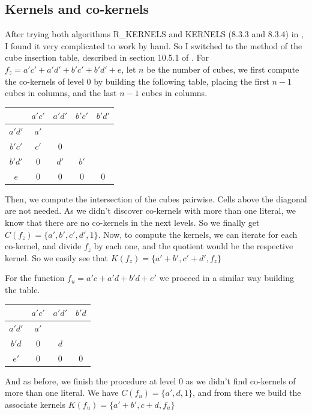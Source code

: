 \documentclass[a4paper]{article}
\begin{document}
\subsection{Kernels and co-kernels}
%
After trying both algorithms R\_KERNELS and KERNELS (8.3.3 and 8.3.4) in 
\cite{micheli}, I found it very complicated to work by hand. So I switched to 
the method of the cube insertion table, described in section 10.5.1 of 
\cite{hachtel}.
%
For $f_z = a'c' + a'd' + b'c' + b'd' + e$, let $n$ be the number of cubes, we 
first compute the co-kernels of level 0 by building the following table, placing 
the first $n-1$ cubes in columns, and the last $n-1$ cubes in columns.
%
\begin{center}
\begin{tabular}{c|cccc}
			 &  $a'c'$   &   $a'd'$   &   $b'c'$   &   $b'd'$  \\
\hline
$a'd'$ &  $a'$     &            &            &           \\
$b'c'$ &  $c'$     &      0     &            &           \\
$b'd'$ &  $0$      &     $d'$   &    $b'$    &           \\
$e$    &   0       &      0     &     0      &     0     \\
\end{tabular}
\end{center}
%
Then, we compute the intersection of the cubes pairwise. Cells above the 
diagonal are not needed. As we didn't discover co-kernels with more than one 
literal, we know that there are no co-kernels in the next levels. So we finally 
get $C(f_z) = \{a', b', c', d', 1\}$. Now, to compute the kernels, we can 
iterate for each co-kernel, and divide $f_z$ by each one, and the quotient would 
be the respective kernel. So we easily see that %
$K(f_z) = \{a' + b', c' + d', f_z\}$

For the function $f_u = a'c + a'd + b'd + e'$ we proceed in a similar way 
building the table.
%
\begin{center}
\begin{tabular}{c|ccc}
			 &  $a'c'$   &   $a'd'$   &   $b'd$   \\
\hline
$a'd'$ &   $a'$    &            &           \\
$b'd$  &    0      &     $d$    &           \\
$e'$   &    0      &     0      &    0      \\
\end{tabular}
\end{center}
%
And as before, we finish the procedure at level 0 as we didn't find co-kernels 
of more than one literal. We have $C(f_u) = \{a', d, 1\}$, and from there we 
build the associate kernels $K(f_u) = \{a'+b', c+d, f_u\}$
%
\end{document}
